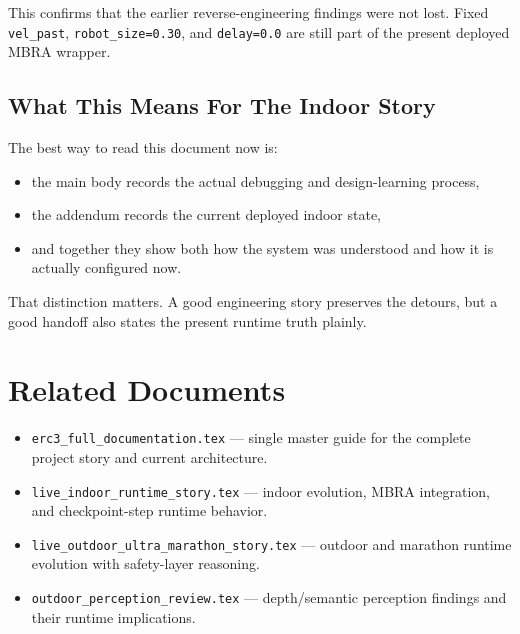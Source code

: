\documentclass[11pt]{article}
\begin{document}
This confirms that the earlier reverse-engineering findings were not lost. Fixed \texttt{vel\_past}, \texttt{robot\_size=0.30}, and \texttt{delay=0.0} are still part of the present deployed MBRA wrapper.

\subsection{What This Means For The Indoor Story}
The best way to read this document now is:
\begin{itemize}
\item the main body records the actual debugging and design-learning process,
\item the addendum records the current deployed indoor state,
\item and together they show both how the system was understood and how it is actually configured now.
\end{itemize}

That distinction matters. A good engineering story preserves the detours, but a good handoff also states the present runtime truth plainly.


\section{Related Documents}
\begin{itemize}
  \item \texttt{erc3\_full\_documentation.tex} --- single master guide for the complete project story and current architecture.
  \item \texttt{live\_indoor\_runtime\_story.tex} --- indoor evolution, MBRA integration, and checkpoint-step runtime behavior.
  \item \texttt{live\_outdoor\_ultra\_marathon\_story.tex} --- outdoor and marathon runtime evolution with safety-layer reasoning.
  \item \texttt{outdoor\_perception\_review.tex} --- depth/semantic perception findings and their runtime implications.
\end{itemize}
\end{document}
